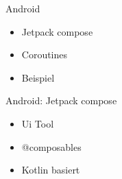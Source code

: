 \documentclass{beamer}
\begin{document}
\begin{frame}[fragile]{Android}
  \begin{itemize}
  
    \item Jetpack compose
    \item Coroutines
    \item Beispiel
  \end{itemize}
  
     \end{frame}

\begin{frame}[fragile]{Android: Jetpack compose}
  \begin{itemize}
  \item Ui Tool
  \item @composables
  \item Kotlin basiert
  \end{itemize}
\end{frame}
\end{document}
